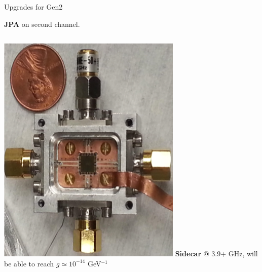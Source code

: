 \documentclass{beamer}
\begin{document}
\begin{frame}{Upgrades for Gen2}

\textbf{JPA} on second channel.
\begin{columns}
\includegraphics[width=\textwidth]{jpa_exposed}
\textbf{Sidecar} @ 3.9+ GHz, {\tiny will be able to reach $g \simeq 10^{-14}$ GeV$^{-1}$}

\end{columns}
\end{frame}
\end{document}
